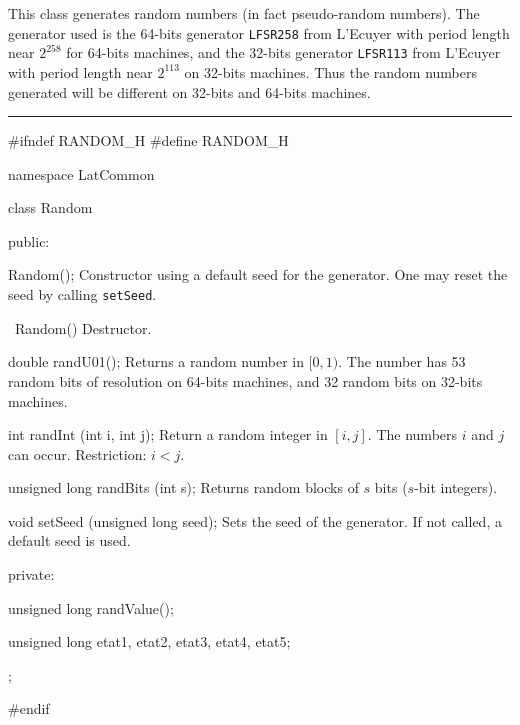 % 
% 
% 
% 


This class generates random numbers (in fact pseudo-random numbers).
The generator used is the 64-bits generator \texttt{LFSR258}
from L'Ecuyer \cite{rLEC99a}  with period length near $2^{258}$
for 64-bits machines, and the 32-bits generator \texttt{LFSR113}
from L'Ecuyer \cite{rLEC99a}  with period length near $2^{113}$
on  32-bits machines. Thus the random numbers generated will be
different on 32-bits and 64-bits machines.

\bigskip\hrule
\code\hide
#ifndef RANDOM_H
#define RANDOM_H
\endhide

namespace LatCommon {

class Random {
public:

   Random();
\endcode
  \tabb Constructor using a default seed for the generator.
   One may reset the seed by calling \texttt{setSeed}.
  \endtabb
\code

   ~Random() \hide {} \endhide
\endcode
\tabb
Destructor.
\endtabb
\code

   double randU01();
\endcode
\tabb
Returns a random number in $[0, 1)$. The number has 53 random bits
of resolution on 64-bits machines, and 32 random bits 
on 32-bits machines.
\endtabb
\code

   int randInt (int i, int j);
\endcode
\tabb
Return a random integer in $[i, j]$. The numbers $i$ and $j$ can occur.
Restriction: $i < j$.
\endtabb
\code

   unsigned long randBits (int s);
\endcode
\tabb Returns random blocks of $s$ bits ($s$-bit integers).
\endtabb
\code

   void setSeed (unsigned long seed);
\endcode
\tabb
Sets the seed of the generator. If not called, a default seed is used.
\endtabb
\code


private:

   unsigned long randValue();

   unsigned long etat1, etat2, etat3, etat4, etat5;
};

}
\hide
#endif
\endhide
\endcode
